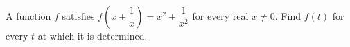 A function $f$ satisfies $f\left(x+\dfrac1x\right)=x^2+\dfrac{1}{x^2}$ for every real $x\ne0$. Find $f(t)$ for every $t$ at which it is determined.
